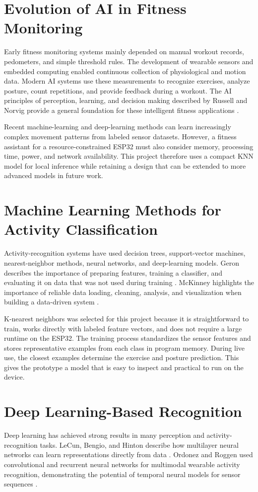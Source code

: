 \section{Evolution of AI in Fitness Monitoring}
Early fitness monitoring systems mainly depended on manual workout records,
pedometers, and simple threshold rules. The development of wearable sensors and
embedded computing enabled continuous collection of physiological and motion data.
Modern AI systems use these measurements to recognize exercises, analyze posture,
count repetitions, and provide feedback during a workout. The AI principles of
perception, learning, and decision making described by Russell and Norvig provide a
general foundation for these intelligent fitness applications
\cite{russell2021aima}.

Recent machine-learning and deep-learning methods can learn increasingly complex
movement patterns from labeled sensor datasets. However, a fitness assistant for a
resource-constrained ESP32 must also consider memory, processing time, power, and
network availability. This project therefore uses a compact KNN model for local
inference while retaining a design that can be extended to more advanced models in
future work.

\section{Machine Learning Methods for Activity Classification}
Activity-recognition systems have used decision trees, support-vector machines,
nearest-neighbor methods, neural networks, and deep-learning models. Geron describes
the importance of preparing features, training a classifier, and evaluating it on
data that was not used during training
\cite{geron2022hands}. McKinney highlights the importance of reliable data loading,
cleaning, analysis, and visualization when building a data-driven system
\cite{mckinney2022python}.

K-nearest neighbors was selected for this project because it is straightforward to
train, works directly with labeled feature vectors, and does not require a large
runtime on the ESP32. The training process standardizes the sensor features and
stores representative examples from each class in program memory. During live use,
the closest examples determine the exercise and posture prediction. This gives the
prototype a model that is easy to inspect and practical to run on the device.

\section{Deep Learning-Based Recognition}
Deep learning has achieved strong results in many perception and activity-recognition
tasks. LeCun, Bengio, and Hinton describe how multilayer neural networks can learn
representations directly from data \cite{lecun2015deep}. Ordonez and Roggen used
convolutional and recurrent neural networks for multimodal wearable activity
recognition, demonstrating the potential of temporal neural models for sensor
sequences \cite{ordonez2016deep}.

